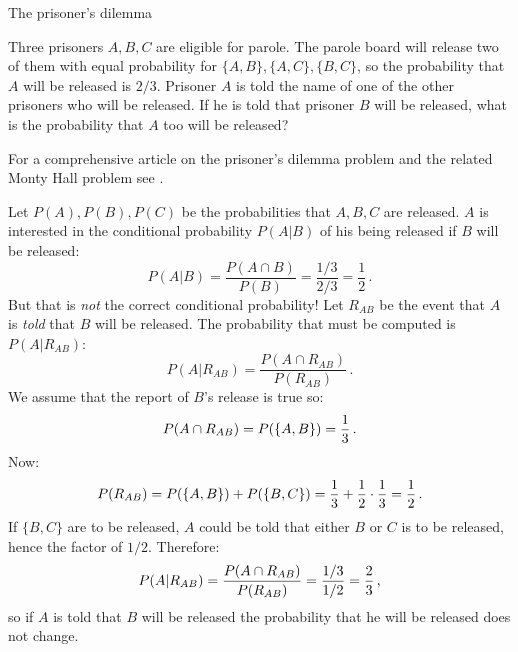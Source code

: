 





\begin{prob}{The prisoner's dilemma}

Three prisoners $A,B,C$ are eligible for parole. The parole board will release two of them with equal probability for $\{A,B\}, \{A,C\}, \{B,C\}$, so the probability that $A$ will be released is $2/3$. Prisoner $A$ is told the name of one of the other prisoners who will be released. If he is told that prisoner $B$ will be released, what is the probability that $A$ too will be released?

For a comprehensive article on the prisoner's dilemma problem and the related Monty Hall problem see \cite{carlton}.
\end{prob}


Let $P(A), P(B), P(C)$ be the probabilities that $A,B,C$ are released. $A$ is interested in the conditional probability $P(A|B)$ of his being released if $B$ will be released:
\[
P(A|B) = \frac{P(A\cap B)}{P(B)} = \frac{1/3}{2/3}=\frac{1}{2}\,.
\]
But that is \emph{not} the correct conditional probability! Let $R_{AB}$ be the event that $A$ is \emph{told} that $B$ will be released. The probability that must be computed is $P(A|R_{AB})$:
\[
P(A|R_{AB}) = \frac{P(A\cap R_{AB})}{P(R_{AB})}\,.
\]
We assume that the report of $B$'s release is true so:
\[
P(A\cap R_{AB})=P(\{A,B\})=\displaystyle\frac{1}{3}\,.
\]
Now:
\[
P(R_{AB})=P(\{A,B\})+P(\{B,C\})=\displaystyle\frac{1}{3}+\displaystyle\frac{1}{2}\cdot \displaystyle\frac{1}{3}=\displaystyle\frac{1}{2}\,.
\]
If $\{B,C\}$ are to be released, $A$ could be told that either $B$ or $C$ is to be released, hence the factor of $1/2$. Therefore:
\[
P(A|R_{AB}) = \frac{P(A\cap R_{AB})}{P(R_{AB})} = \displaystyle\frac{1/3}{1/2}=\displaystyle\frac{2}{3}\,,
\]
so if $A$ is told that $B$ will be released the probability that he will be released does not change.


